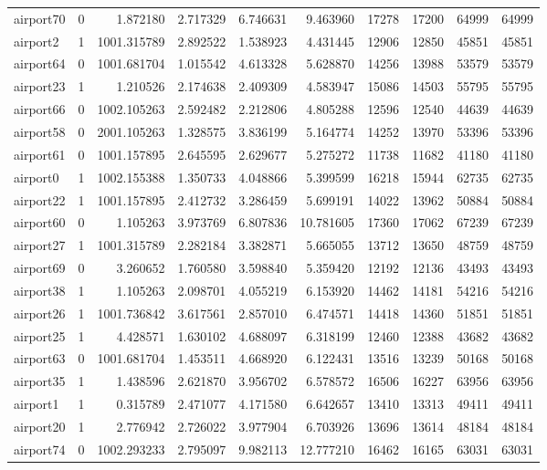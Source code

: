 \begin{longtable}{|l|r|r|r|r|r|r|r|r|r|}
airport70 & 0 & 1.872180 & 2.717329 & 6.746631 & 9.463960 & 17278 & 17200 & 64999 & 64999 \\
airport2 & 1 & 1001.315789 & 2.892522 & 1.538923 & 4.431445 & 12906 & 12850 & 45851 & 45851 \\
airport64 & 0 & 1001.681704 & 1.015542 & 4.613328 & 5.628870 & 14256 & 13988 & 53579 & 53579 \\
airport23 & 1 & 1.210526 & 2.174638 & 2.409309 & 4.583947 & 15086 & 14503 & 55795 & 55795 \\
airport66 & 0 & 1002.105263 & 2.592482 & 2.212806 & 4.805288 & 12596 & 12540 & 44639 & 44639 \\
airport58 & 0 & 2001.105263 & 1.328575 & 3.836199 & 5.164774 & 14252 & 13970 & 53396 & 53396 \\
airport61 & 0 & 1001.157895 & 2.645595 & 2.629677 & 5.275272 & 11738 & 11682 & 41180 & 41180 \\
airport0 & 1 & 1002.155388 & 1.350733 & 4.048866 & 5.399599 & 16218 & 15944 & 62735 & 62735 \\
airport22 & 1 & 1001.157895 & 2.412732 & 3.286459 & 5.699191 & 14022 & 13962 & 50884 & 50884 \\
airport60 & 0 & 1.105263 & 3.973769 & 6.807836 & 10.781605 & 17360 & 17062 & 67239 & 67239 \\
airport27 & 1 & 1001.315789 & 2.282184 & 3.382871 & 5.665055 & 13712 & 13650 & 48759 & 48759 \\
airport69 & 0 & 3.260652 & 1.760580 & 3.598840 & 5.359420 & 12192 & 12136 & 43493 & 43493 \\
airport38 & 1 & 1.105263 & 2.098701 & 4.055219 & 6.153920 & 14462 & 14181 & 54216 & 54216 \\
airport26 & 1 & 1001.736842 & 3.617561 & 2.857010 & 6.474571 & 14418 & 14360 & 51851 & 51851 \\
airport25 & 1 & 4.428571 & 1.630102 & 4.688097 & 6.318199 & 12460 & 12388 & 43682 & 43682 \\
airport63 & 0 & 1001.681704 & 1.453511 & 4.668920 & 6.122431 & 13516 & 13239 & 50168 & 50168 \\
airport35 & 1 & 1.438596 & 2.621870 & 3.956702 & 6.578572 & 16506 & 16227 & 63956 & 63956 \\
airport1 & 1 & 0.315789 & 2.471077 & 4.171580 & 6.642657 & 13410 & 13313 & 49411 & 49411 \\
airport20 & 1 & 2.776942 & 2.726022 & 3.977904 & 6.703926 & 13696 & 13614 & 48184 & 48184 \\
airport74 & 0 & 1002.293233 & 2.795097 & 9.982113 & 12.777210 & 16462 & 16165 & 63031 & 63031 \\

\end{longtable}
